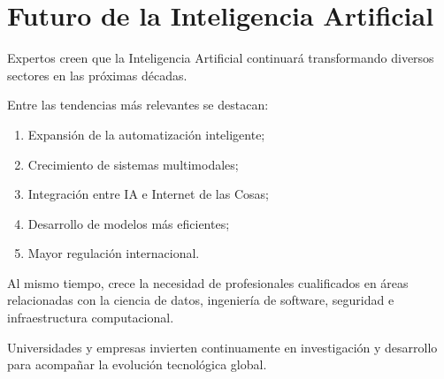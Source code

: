 \section{Futuro de la Inteligencia Artificial}

Expertos creen que la Inteligencia Artificial continuará transformando diversos sectores
en las próximas décadas.

Entre las tendencias más relevantes se destacan:

\begin{enumerate}
    \item Expansión de la automatización inteligente;
    \item Crecimiento de sistemas multimodales;
    \item Integración entre IA e Internet de las Cosas;
    \item Desarrollo de modelos más eficientes;
    \item Mayor regulación internacional.
\end{enumerate}

Al mismo tiempo, crece la necesidad de profesionales cualificados en áreas relacionadas con la
ciencia de datos, ingeniería de software, seguridad e infraestructura computacional.

Universidades y empresas invierten continuamente en investigación y desarrollo para
acompañar la evolución tecnológica global. 